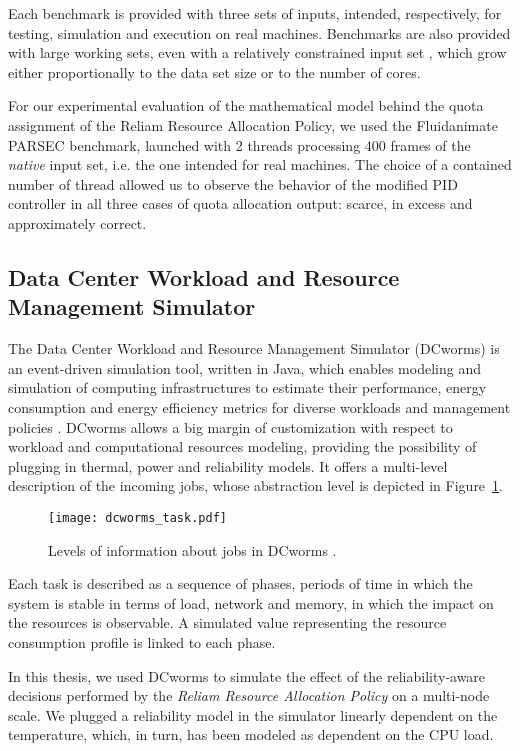 Each benchmark is provided with three sets of inputs, intended, respectively, for testing, simulation and execution on real machines. Benchmarks are also provided with large working sets, even with a relatively constrained input set \cite{7849432}, which grow either proportionally to the data set size or to the number of cores.

For our experimental evaluation of the mathematical model behind the quota assignment of the Reliam Resource Allocation Policy, we used the Fluidanimate PARSEC benchmark, launched with 2 threads processing 400 frames of the \emph{native} input set, i.e. the one intended for real machines. The choice of a contained number of thread allowed us to observe the behavior of the modified PID controller in all three cases of quota allocation output:  scarce, in excess and approximately correct.

\subsection{Data Center Workload and Resource Management Simulator}
\label{sec:dcworms}
The Data Center Workload and Resource Management Simulator (DCworms) is an event-driven simulation tool, written in Java, which enables modeling and simulation of computing infrastructures to estimate their performance, energy consumption and energy efficiency metrics for diverse workloads and management policies \cite{DCworms}. DCworms allows a big margin of customization with respect to workload and computational resources modeling, providing the possibility of plugging in thermal, power and reliability models. It offers a multi-level description of the incoming jobs, whose abstraction level is depicted in Figure~\ref{fig:tasks}.
\begin{figure}
    \centering
    \texttt{[image: dcworms\_task.pdf]}
    \caption{Levels of information about jobs in DCworms \cite{DCworms}.}
    \label{fig:tasks}
\end{figure}
Each task is described as a sequence of phases, periods of time in which the system is stable in terms of load, network and memory, in which the impact on the resources is observable. A simulated value representing the resource consumption profile is linked to each phase. 

In this thesis, we used DCworms to simulate the effect of the reliability-aware decisions performed by the \emph{Reliam Resource Allocation Policy} on a multi-node scale. We plugged a reliability model in the simulator linearly dependent on the temperature, which, in turn, has been modeled as dependent on the CPU load.

